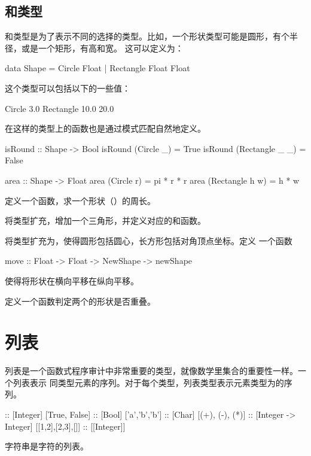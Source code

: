 \subsection{和类型}
和类型是为了表示不同的选择的类型。比如，一个形状类型可能是圆形，有个半径，或是一个矩形，有高和宽。
这可以定义为：
\begin{code}
data Shape = Circle Float
           | Rectangle Float Float
\end{code}
这个类型可以包括以下的一些值：
\begin{code}
Circle 3.0
Rectangle 10.0 20.0
\end{code}
在这样的类型上的函数也是通过模式匹配自然地定义。
\begin{code}
isRound :: Shape -> Bool
isRound (Circle _)      = True
isRound (Rectangle _ _) = False
\end{code}
\begin{code}
area :: Shape -> Float
area (Circle r)      = pi * r * r
area (Rectangle h w) = h * w
\end{code}

\begin{exercise}
定义一个函数，求一个形状（）的周长。
\end{exercise}

\begin{exercise}
将类型扩充，增加一个三角形，并定义对应的和函数。
\end{exercise}

\begin{exercise}
将类型扩充为，使得圆形包括圆心，长方形包括对角顶点坐标。定义
一个函数
\begin{code}
move :: Float -> Float -> NewShape -> newShape
\end{code}
使得将形状在横向平移在纵向平移。
\end{exercise}

\begin{exercise}
定义一个函数判定两个的形状是否重叠。
\end{exercise}

\section{列表}

列表是一个函数式程序审计中非常重要的类型，就像数学里集合的重要性一样。一个列表表示
同类型元素的序列。对于每个类型，列表类型\hs{[t]}表示元素类型为的序列。
\begin{code}
[1,2,3,4] :: [Integer]
[True, False] :: [Bool]
['a','b','b'] :: [Char]
[(+), (-), (*)] :: [Integer -> Integer]
[[1,2],[2,3],[]] :: [[Integer]]
\end{code}
字符串是字符的列表\hs{[Char]}。

